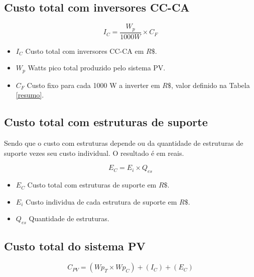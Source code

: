 \subsection{Custo total com inversores CC-CA}

\begin{equation}
    I_{C} = \frac{W_{p}} {1000 W} \times C_{F}
    \label{eq:EV_custo}
\end{equation}

\begin{itemize}
  \item $I_{C}$ Custo total com inversores CC-CA em $R\$$.

  \item $W_{p}$ Watts pico total produzido pelo sistema PV.
  
  \item $C_{F}$ Custo fixo para cada 1000 W a inverter em $R\$$, valor definido na Tabela \ref{resumo}.
\end{itemize}

\subsection{Custo total com estruturas de suporte}

Sendo que o custo com estruturas depende ou da quantidade de estruturas de suporte vezes seu custo individual. O resultado é em reais.

\begin{equation}
    E_{C} = E_{i}  \times Q_{es}
    \label{eq:Vagas_custo}
\end{equation}

\begin{itemize}
  \item $E_{C}$ Custo total com estruturas de suporte em $R\$$.

    \item $E_{i}$ Custo individua de cada estrutura de suporte em $R\$$.

  \item $Q_{es}$ Quantidade de estruturas.
\end{itemize}

\subsection{Custo total do sistema PV}

\begin{equation}
    C_{PV} = (Wp_{T} \times Wp_{C} ) + (I_{C}) + (E_{C})
    \label{eq:EV_custo}
\end{equation}

